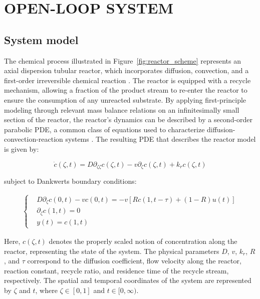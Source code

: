 \section{OPEN-LOOP SYSTEM} \label{sec:model}

\subsection{System model}

The chemical process illustrated in Figure~\ref{fig:reactor_scheme} represents an axial dispersion tubular reactor, which incorporates diffusion, convection, and a first-order irreversible chemical reaction \autocite{levenspiel1998chemical}. The reactor is equipped with a recycle mechanism, allowing a fraction of the product stream to re-enter the reactor to ensure the consumption of any unreacted substrate. By applying first-principle modeling through relevant mass balance relations on an infinitesimally small section of the reactor, the reactor's dynamics can be described by a second-order parabolic PDE, a common class of equations used to characterize diffusion-convection-reaction systems \autocite{jensen1982bifurcation}. The resulting PDE that describes the reactor model is given by:

\begin{equation} \label{eq:PDE_original_model}
    \dot{c}(\zeta, t) = D \partial_{\zeta \zeta} c(\zeta, t) - v \partial_\zeta c(\zeta, t) + k_r c(\zeta, t)
\end{equation}

subject to Dankwerts boundary conditions:

\begin{align} \label{eq:BC}
    \begin{cases}
        &D \partial_\zeta c(0, t) - v c(0, t) = -v \left[ R c(1, t-\tau) + (1-R) u(t) \right] \\
        &\partial_\zeta c(1, t) = 0 \\
        &y(t) = c(1, t)
    \end{cases}
\end{align}

Here, $c(\zeta, t)$ denotes the properly scaled notion of concentration along the reactor, representing the state of the system. The physical parameters $D$, $v$, $k_r$, $R$, and $\tau$ correspond to the diffusion coefficient, flow velocity along the reactor, reaction constant, recycle ratio, and residence time of the recycle stream, respectively. The spatial and temporal coordinates of the system are represented by $\zeta$ and $t$, where $\zeta \in [0, 1]$ and $t \in [0, \infty)$.

